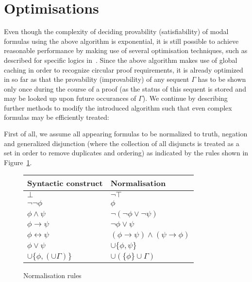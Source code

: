 \documentclass{llncs}
\begin{document}
\section{Optimisations}

Even though the complexity of deciding provability (satisfiability) of modal formulas
using the above algorithm is exponential,
it is still possible to achieve reasonable performance by making
use of several optimisation techniques, such as described for specific
logics in~\cite{HorrocksPatelSchneider99}. 
Since the above algorithm makes use of global caching in order to
recognize circular proof requirements, it is already optimized in so far as that
the provability (improvability) of any sequent $\Gamma$ has to be shown only once during
the course of a proof (as the status of this sequent is stored and may be looked up upon future occurances of $\Gamma$).
We continue by describing further methods to modify the introduced algorithm such
that even complex formulas may be efficiently treated:

First of all, we assume all appearing formulas to be normalized to truth,
negation and generalized disjunction (where the collection of all disjuncts is treated as a set
in order to remove duplicates and ordering) as indicated by the rules shown in 
Figure~\ref{fig:normalisation}.

\begin{footnotesize}
\begin{figure}[!h]
  \begin{center}
\begin{tabular}{| l | l |}
\hline
Syntactic construct & Normalisation \\
\hline
$\bot$ & $\neg\top$ \\
$\neg\neg\phi$ & $\phi$ \\
$\phi\wedge\psi$ & $\neg(\neg\phi\vee\neg\psi)$ \\
$\phi\rightarrow\psi$ & $\neg\phi\vee \psi$ \\
$\phi\leftrightarrow\psi$ & $(\phi\rightarrow\psi)\wedge(\psi\rightarrow\phi)$ \\
$\phi\vee\psi$ & $\cup\{\phi,\psi\}$ \\
$\cup\{\phi,(\cup\Gamma)\}$ & $\cup(\{\phi\}\cup\Gamma)$ \\
\hline
 \end{tabular}
  \end{center}
  \caption{Normalisation rules}
  \label{fig:normalisation}
\end{figure}
\end{footnotesize}
\end{document}
